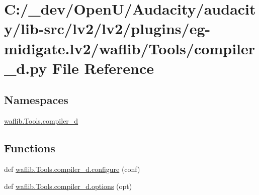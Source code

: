 \hypertarget{lv2_2plugins_2eg-midigate_8lv2_2waflib_2_tools_2compiler__d_8py}{}\section{C\+:/\+\_\+dev/\+Open\+U/\+Audacity/audacity/lib-\/src/lv2/lv2/plugins/eg-\/midigate.lv2/waflib/\+Tools/compiler\+\_\+d.py File Reference}
\label{lv2_2plugins_2eg-midigate_8lv2_2waflib_2_tools_2compiler__d_8py}
\subsection*{Namespaces}
\begin{DoxyCompactItemize}
\item 
 \hyperlink{namespacewaflib_1_1_tools_1_1compiler__d}{waflib.\+Tools.\+compiler\+\_\+d}
\end{DoxyCompactItemize}
\subsection*{Functions}
\begin{DoxyCompactItemize}
\item 
def \hyperlink{namespacewaflib_1_1_tools_1_1compiler__d_a1bde6bb386d77bc326bb0a1b73688c4f}{waflib.\+Tools.\+compiler\+\_\+d.\+configure} (conf)
\item 
def \hyperlink{namespacewaflib_1_1_tools_1_1compiler__d_a4f8b0fc5058863cd242ac3d83ff8f022}{waflib.\+Tools.\+compiler\+\_\+d.\+options} (opt)
\end{DoxyCompactItemize}
